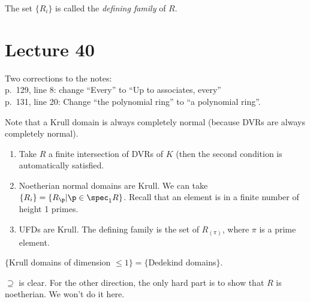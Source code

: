 The set $\{R_i\}$ is called the \emph{defining family} of $R$.
 \setcounter{lecture}{40}
 \section{Lecture 40}

 Two corrections to the notes:\\
 p.~129, line 8: change ``Every'' to ``Up to associates, every''\\
 p.~131, line 20: Change ``the polynomial ring'' to ``a polynomial ring''.

 Note that a Krull domain is always completely normal (because DVRs are always completely
 normal).

 \begin{example}
   \begin{enumerate}
     \item Take $R$ a finite intersection of DVRs of $K$ (then the second condition is
     automatically satisfied.
     \item Noetherian normal domains are Krull. We can take $\{R_i\}=\{R_\p|\p\in \spec_1
     R\}$. Recall that an element is in a finite number of height 1 primes.
     \item UFDs are Krull. The defining family is the set of $R_{(\pi)}$, where $\pi$ is
     a prime element.
   \end{enumerate}
   \vspace*{-1.7\baselineskip}
 \end{example}
 \begin{theorem}
   $\{$Krull domains of dimension $\le 1\} = \{$Dedekind domains$\}$.
 \end{theorem}
 $\supseteq$ is clear. For the other direction, the only hard part is to show that $R$
 is noetherian. We won't do it here.

